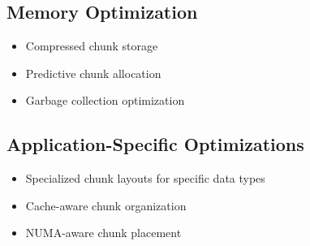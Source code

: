 \subsection{Memory Optimization}
\begin{itemize}
    \item Compressed chunk storage
    \item Predictive chunk allocation
    \item Garbage collection optimization
\end{itemize}

\subsection{Application-Specific Optimizations}
\begin{itemize}
    \item Specialized chunk layouts for specific data types
    \item Cache-aware chunk organization
    \item NUMA-aware chunk placement
\end{itemize} 